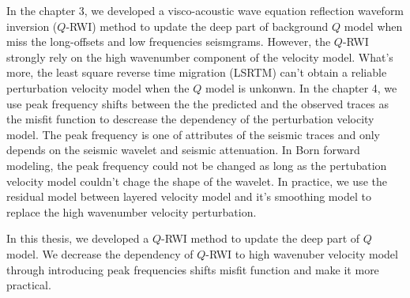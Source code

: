 \begin{englishabstract}
In the chapter 3, we developed a visco-acoustic wave equation reflection waveform 
inversion ($Q$-RWI) method to update the deep part of background $Q$ model when 
miss the long-offsets and low frequencies seismgrams. However, the $Q$-RWI strongly 
rely on the high wavenumber component of the velocity model. What's more, 
the least square reverse time migration (LSRTM) can't obtain a reliable perturbation 
velocity model when the $Q$ model is unkonwn. In the chapter 4, we use peak frequency 
shifts between the the predicted and the observed traces as the misfit function 
to descrease the dependency of the perturbation velocity model. The peak frequency 
is one of attributes of the seismic traces and only depends on the seismic wavelet 
and seismic attenuation. In Born forward modeling, the peak frequency could not be
changed as long as the pertubation velocity model couldn't chage the shape of the 
wavelet. In practice, we use the residual model between layered velocity model and it's 
smoothing model to replace the high wavenumber velocity perturbation. 

In this thesis, we developed a $Q$-RWI method to update the deep part of $Q$ model.
We decrease the dependency of $Q$-RWI to high wavenuber velocity model through introducing 
peak frequencies shifts misfit function and make it more practical.


  
  
\end{englishabstract}
